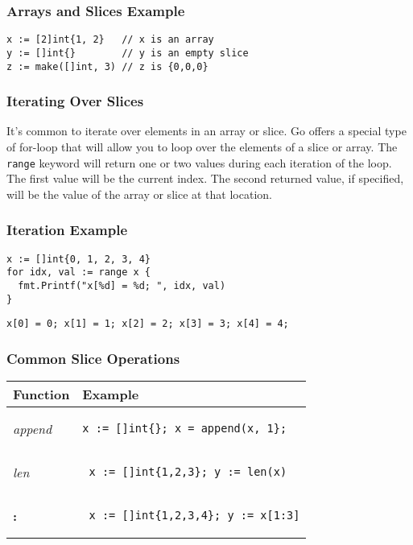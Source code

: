 \documentclass{beamer}
\begin{document}
\begin{frame}[fragile]
  \frametitle{Arrays and Slices Example}
\begin{lstlisting}[language=Golang]
x := [2]int{1, 2}   // x is an array
y := []int{}        // y is an empty slice
z := make([]int, 3) // z is {0,0,0}
\end{lstlisting}
\end{frame}

\begin{frame}
  \frametitle{Iterating Over Slices}
  It's common to iterate over elements in an array or slice.  Go
  offers a special type of for-loop that will allow you to loop over
  the elements of a slice or array.  The {\tt range} keyword will
  return one or two values during each iteration of the loop.  The
  first value will be the current index.  The second returned value,
  if specified, will be the value of the array or slice at that
  location.
\end{frame}

\begin{frame}[fragile]
  \frametitle{Iteration Example}
\begin{lstlisting}[language=Golang]
x := []int{0, 1, 2, 3, 4}
for idx, val := range x {
  fmt.Printf("x[%d] = %d; ", idx, val)
}
\end{lstlisting}
\begin{verbatim}
x[0] = 0; x[1] = 1; x[2] = 2; x[3] = 3; x[4] = 4;
\end{verbatim}
\end{frame}

\begin{frame}[fragile]
  \frametitle{Common Slice Operations}
  \begin{tabular}{| l | p{3in} |}
    \hline
    Function  & Example \\
    \hline
    \emph{append} &
\begin{verbatim}x := []int{}; x = append(x, 1};\end{verbatim}
    \\
    \hline
    \emph{len} &
\begin{verbatim} x := []int{1,2,3}; y := len(x)\end{verbatim}
    \\
    \hline
    {\bf :} &
\begin{verbatim} x := []int{1,2,3,4}; y := x[1:3]\end{verbatim}
    \\
    \hline
  \end{tabular}
\end{frame}
\end{document}
